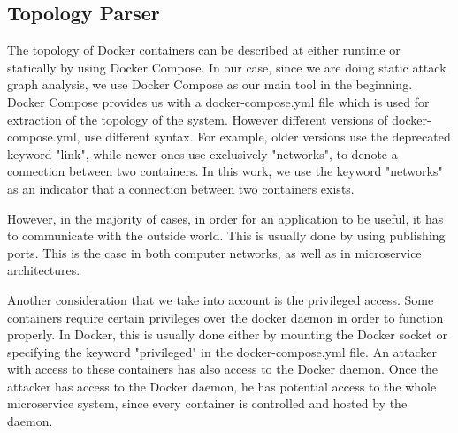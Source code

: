 \subsection{Topology Parser}
\label{chap:topology_p}

The topology of Docker containers can be described at either runtime or statically by using Docker Compose. In our case, since we are doing static attack graph analysis, we use Docker Compose as our main tool in the beginning. Docker Compose provides us with a docker-compose.yml file which is used for extraction of the topology of the system. However different versions of docker-compose.yml, use different syntax. For example, older versions use the deprecated keyword "link", while newer ones use exclusively "networks", to denote a connection between two containers. In this work, we use the keyword "networks" as an indicator that a connection between two containers exists.

However, in the majority of cases, in order for an application to be useful, it has to communicate with the outside world. This is usually done by using publishing ports. This is the case in both computer networks, as well as in microservice architectures.

Another consideration that we take into account is the privileged access. Some containers require certain privileges over the docker daemon in order to function properly. In Docker, this is usually done either by mounting the Docker socket or specifying the keyword "privileged" in the docker-compose.yml file. An attacker with access to these containers has also access to the Docker daemon. Once the attacker has access to the Docker daemon, he has potential access to the whole microservice system, since every container is controlled and hosted by the daemon.

